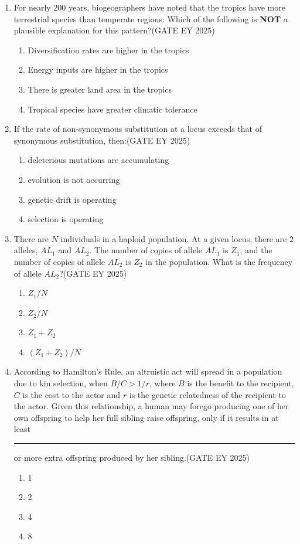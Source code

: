 \begin{enumerate}[leftmargin=*,label=\textbf{Q.\arabic*},resume]

\item For nearly 200 years, biogeographers have noted that the tropics have more terrestrial species than temperate regions. Which of the following is \textbf{NOT} a plausible explanation for this pattern?\hfill {(GATE EY 2025)}
\begin{enumerate}
\item Diversification rates are higher in the tropics
\item Energy inputs are higher in the tropics
\item There is greater land area in the tropics
\item Tropical species have greater climatic tolerance
\end{enumerate}

\item If the rate of non-synonymous substitution at a locus exceeds that of synonymous substitution, then:\hfill {(GATE EY 2025)}
\begin{enumerate}
\item deleterious mutations are accumulating
\item evolution is not occurring
\item genetic drift is operating
\item selection is operating
\end{enumerate}

\item There are $N$ individuals in a haploid population. At a given locus, there are $2$ alleles, $AL_1$ and $AL_2$. The number of copies of allele $AL_1$ is $Z_1$, and the number of copies of allele $AL_2$ is $Z_2$ in the population. What is the frequency of allele $AL_2$?\hfill {(GATE EY 2025)}
\begin{enumerate}
\item $Z_1/N$
\item $Z_2/N$
\item $Z_1 + Z_2$
\item $(Z_1 + Z_2)/N$
\end{enumerate}

\item According to Hamilton's Rule, an altruistic act will spread in a population due to kin selection, when $B/C > 1/r$, where $B$ is the benefit to the recipient, $C$ is the cost to the actor and $r$ is the genetic relatedness of the recipient to the actor. Given this relationship, a human may forego producing one of her own offspring to help her full sibling raise offspring, only if it results in at least \rule{2cm}{0.15mm} or more extra offspring produced by her sibling.\hfill {(GATE EY 2025)}
\begin{enumerate}
\item 1
\item 2
\item 4
\item 8
\end{enumerate}


\end{enumerate}
